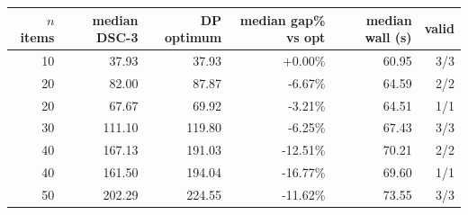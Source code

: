 \begin{tabular}{rrrrrr}
\toprule
$n$ items & median DSC-3 & DP optimum & median gap\% vs opt & median wall (s) & valid \\
\midrule
10 & 37.93 & 37.93 & +0.00\% & 60.95 & 3/3 \\
20 & 82.00 & 87.87 & -6.67\% & 64.59 & 2/2 \\
20 & 67.67 & 69.92 & -3.21\% & 64.51 & 1/1 \\
30 & 111.10 & 119.80 & -6.25\% & 67.43 & 3/3 \\
40 & 167.13 & 191.03 & -12.51\% & 70.21 & 2/2 \\
40 & 161.50 & 194.04 & -16.77\% & 69.60 & 1/1 \\
50 & 202.29 & 224.55 & -11.62\% & 73.55 & 3/3 \\
\bottomrule
\end{tabular}
